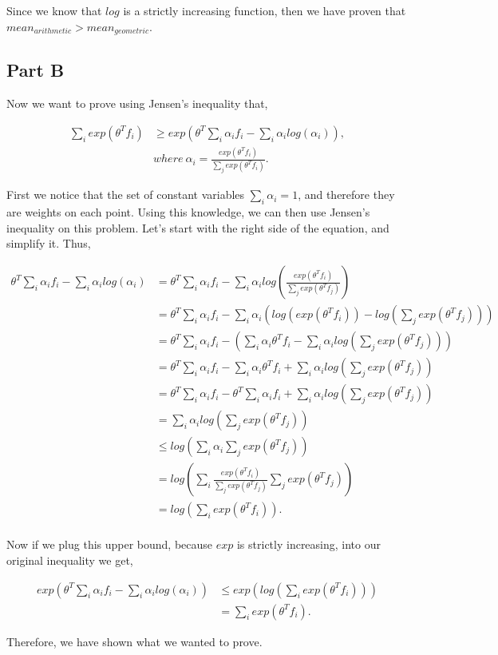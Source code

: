 \documentclass[paper=a4, fontsize=11pt]{scrartcl} %
\begin{document}
Since we know that $log$ is a strictly increasing function, then we have proven that $ mean_{arithmetic} > mean_{geometric}$.

\subsection{Part B}
Now we want to prove using Jensen's inequality that, 

\begin{align}
\sum_i exp(\theta^Tf_i) &\ge exp( \theta^T \sum_i \alpha_if_i - \sum_i \alpha_i log(\alpha_i)), \\
&where\   \alpha_i = \frac{ exp(\theta^Tf_i)}{\sum_j  exp(\theta^Tf_i)}.
\end{align}

First we notice that the set of constant variables $\sum_i \alpha_i = 1$, and therefore they are weights on each point.
Using this knowledge, we can then use Jensen's inequality on this problem.
Let's start with the right side of the equation, and simplify it.
Thus, 

\begin{align}
 \theta^T \sum_i \alpha_if_i - \sum_i \alpha_i log(\alpha_i) &=  \theta^T \sum_i \alpha_if_i - \sum_i \alpha_i log(\frac{exp(\theta^Tf_i)}{\sum_j exp(\theta^Tf_j)}) \\
&=  \theta^T \sum_i \alpha_if_i - \sum_i \alpha_i (log(exp(\theta^Tf_i)) - log(\sum_j exp(\theta^Tf_j))) \\
&= \theta^T \sum_i \alpha_if_i - (\sum_i \alpha_i \theta^T f_i -  \sum_i  \alpha_i  log(\sum_j exp(\theta^Tf_j))) \\
&=  \theta^T \sum_i \alpha_if_i - \sum_i \alpha_i \theta^T f_i + \sum_i  \alpha_i  log(\sum_j exp(\theta^Tf_j)) \\
&=  \theta^T \sum_i \alpha_if_i - \theta^T \sum_i \alpha_i f_i + \sum_i  \alpha_i  log(\sum_j exp(\theta^Tf_j)) \\
& =  \sum_i  \alpha_i  log(\sum_j exp(\theta^Tf_j)) \\
& \le  log( \sum_i \alpha_i \sum_j exp(\theta^T f_j)) \\
&= log( \sum_i \frac{exp(\theta^T f_i)}{\sum_j exp(\theta^Tf_j)}\sum_j exp(\theta^Tf_j)) \\
&= log(\sum_i exp(\theta^T f_i)). \\
\end{align}

Now if we plug this upper bound, because $exp$ is strictly increasing, into our original inequality we get, 

\begin{align}
 exp( \theta^T \sum_i \alpha_if_i - \sum_i \alpha_i log(\alpha_i)) &\le exp( log(\sum_i exp(\theta^T f_i))) \\
&= \sum_i exp(\theta^T f_i).
\end{align}

Therefore, we have shown what we wanted to prove.
\end{document}
